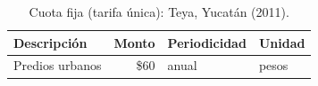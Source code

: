 \begin{table}[htbp]
\centering
\small
\begin{tabular}{lrll}
\toprule
Descripción & Monto & Periodicidad & Unidad \\
\midrule
Predios urbanos & \$60 & anual & pesos \\
\bottomrule
\end{tabular}
\caption{Cuota fija (tarifa única): Teya, Yucatán (2011).}
\label{tab:esquema-cuota_fija}

\end{table}
